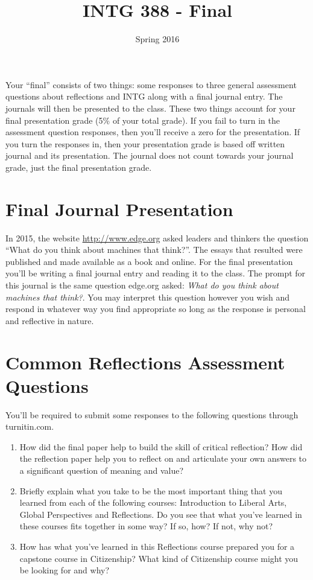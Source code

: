 \documentclass[]{tufte-handout}
\title{INTG 388 - Final }
\author{}
\date{ Spring 2016 }
\begin{document}
\maketitle

Your ``final'' consists of two things: some responses to three general assessment questions about reflections and INTG along with a final journal entry. The journals will then be presented to the class. These two things account for your final presentation grade (5\% of your total grade). If you fail to turn in the assessment question responses, then you'll receive a zero for the presentation. If you turn the responses in, then your presentation grade is based off written journal and its presentation.  The journal does not count towards your journal grade, just the final presentation grade.  

\section*{Final Journal Presentation}

In 2015, the website \url{http://www.edge.org} asked leaders and thinkers the question ``What do you think about machines that think?''. The essays that resulted were published and made available as a book and online. For the final presentation you'll be writing a final journal entry and reading it to the class. The prompt for this journal is the same question edge.org asked: \textit{What do you think about machines that think?}.  You may interpret this question however you wish and respond in whatever way you find appropriate so long as the response is personal and reflective in nature. 


\section*{Common Reflections Assessment Questions}

You'll be required to submit some responses to the following questions through turnitin.com.
\begin{enumerate}
\item How did the final paper help to build the skill of critical reflection? How did the reflection paper help you to reflect on and articulate your own answers to a significant question of meaning and value?

\item Briefly explain what you take to be the most important thing that you learned from each of the following courses: Introduction to Liberal Arts, Global Perspectives and Reflections. Do you see that what you've learned in these courses fits together in some way? If so, how? If not, why not?

\item How has what you've learned in this Reflections course prepared you for a capstone course in Citizenship? What kind of Citizenship course might you be looking for and why?
\end{enumerate}
\end{document}
